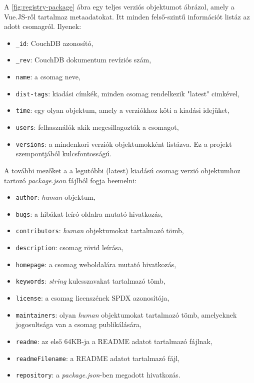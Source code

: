 \pagebreak

A \ref{fig:registry-package} ábra egy teljes verziós objektumot ábrázol, amely a Vue.JS-ről tartalmaz metaadatokat. Itt minden felső-szintű információt listáz az adott csomagról. Ilyenek:

\begin{itemize}
	\item \texttt{\_id}: CouchDB azonosító,
	\item \texttt{\_rev}: CouchDB dokumentum revíziós szám,
	\item \texttt{name}: a csomag neve,
	\item \texttt{dist-tags}: kiadási címkék, minden csomag rendelkezik "latest" cimkével,
	\item \texttt{time}: egy olyan objektum, amely a verziókhoz köti a kiadási idejüket,
	\item \texttt{users}: felhasználók akik megcsillagozták a csomagot,
	\item \texttt{versions}: a mindenkori verziók objektumokként listázva. Ez a projekt szempontjából kulcsfontosságú.
\end{itemize}

A további mezőket a a legutóbbi (latest) kiadású csomag verzió objektumhoz tartozó \emph{package.json} fájlból fogja beemelni:

\begin{itemize}
	\item \texttt{author}: \emph{human} objektum,
	\item \texttt{bugs}: a hibákat leíró oldalra mutató hivatkozás,
	\item \texttt{contributors}: \emph{human} objektumokat tartalmazó tömb,
	\item \texttt{description}: csomag rövid leírása,
	\item \texttt{homepage}: a csomag weboldalára mutató hivatkozás,
	\item \texttt{keywords}: \emph{string} kulcsszavakat tartalmazó tömb,
	\item \texttt{license}: a csomag licenszének SPDX azonosítója,
	\item \texttt{maintainers}: olyan \emph{human} objektumokat tartalmazó tömb, amelyeknek jogosultsága van a csomag publikálására,
	\item \texttt{readme}: az első 64KB-ja a README adatot tartalmazó fájlnak,
	\item \texttt{readmeFilename}: a README adatot tartalmazó fájl,
	\item \texttt{repository}: a \emph{package.json}-ben megadott hivatkozás.
\end{itemize}

